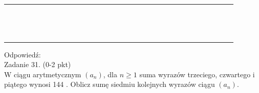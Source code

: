 \documentclass[10pt]{article}
\begin{document}
\begin{center}
\begin{tabular}{|c|c|c|c|c|c|c|c|c|c|c|c|c|c|c|c|c|c|c|c|c|c|c|c|c|c|c|c|c|c|c|c|}
\hline
 &  &  &  &  &  &  &  &  &  &  &  &  &  &  &  &  &  &  &  &  &  &  &  &  &  &  &  &  &  &  &  \\
\hline
 &  &  &  &  &  &  &  &  &  &  &  &  &  &  &  &  &  &  &  &  &  &  &  &  &  &  &  &  &  &  &  \\
\hline
 &  &  &  &  &  &  &  &  &  &  &  &  &  &  &  &  &  &  &  &  &  &  &  &  &  &  &  &  &  &  &  \\
\hline
 &  &  &  &  &  &  &  &  &  &  &  &  &  &  &  &  &  &  &  &  &  &  &  &  &  &  &  &  &  &  &  \\
\hline
 &  &  &  &  &  &  &  &  &  &  &  &  &  &  &  &  &  &  &  &  &  &  &  &  &  &  &  &  &  &  &  \\
\hline
 &  &  &  &  &  &  &  &  &  &  &  &  &  &  &  &  &  &  &  &  &  &  &  &  &  &  &  &  &  &  &  \\
\hline
 &  &  &  &  &  &  &  &  &  &  &  &  &  &  &  &  &  &  &  &  &  &  &  &  &  &  &  &  &  &  &  \\
\hline
 &  &  &  &  &  &  &  &  &  &  &  &  &  &  &  &  &  &  &  &  &  &  &  &  &  &  &  &  &  &  &  \\
\hline
 &  &  &  &  &  &  &  &  &  &  &  &  &  &  &  &  &  &  &  &  &  &  &  &  &  &  &  &  &  &  &  \\
\hline
 &  &  &  &  &  &  &  &  &  &  &  &  &  &  &  &  &  &  &  &  &  &  &  &  &  &  &  &  &  &  &  \\
\hline
 &  &  &  &  &  &  &  &  &  &  &  &  &  &  &  &  &  &  &  &  &  &  &  &  &  &  &  &  &  &  &  \\
\hline
 &  &  &  &  &  &  &  &  &  &  &  &  &  &  &  &  &  &  &  &  &  &  &  &  &  &  &  &  &  &  &  \\
\hline
 &  &  &  &  &  &  &  &  &  &  &  &  &  &  &  &  &  &  &  &  &  &  &  &  &  &  &  &  &  &  &  \\
\hline
 &  &  &  &  &  &  &  &  &  &  &  &  &  &  &  &  &  &  &  &  &  &  &  &  &  &  &  &  &  &  &  \\
\hline
 &  &  &  &  &  &  &  &  &  &  &  &  &  &  &  &  &  &  &  &  &  &  &  &  &  &  &  &  &  &  &  \\
\hline
\end{tabular}
\end{center}

Odpowiedź:\\
Zadanie 31. (0-2 pkt)\\
W ciągu arytmetycznym \(\left(a_{n}\right)\), dla \(n \geq 1\) suma wyrazów trzeciego, czwartego i piątego wynosi 144 . Oblicz sumę siedmiu kolejnych wyrazów ciągu \(\left(a_{n}\right)\).
\end{document}
